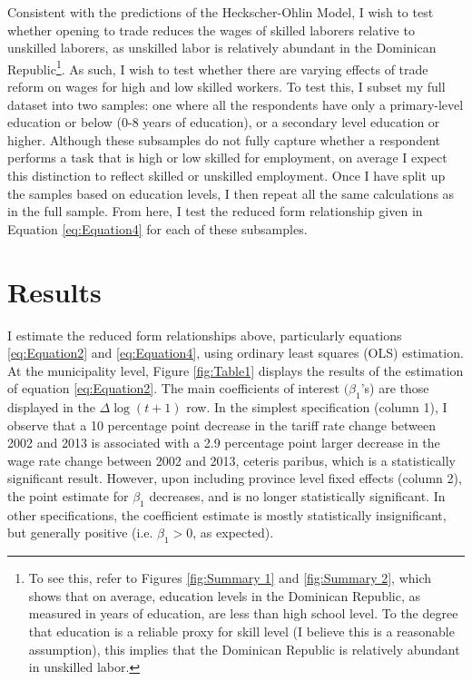 \documentclass[12pt]{article}
\begin{document}
Consistent with the predictions of the Heckscher-Ohlin Model, I wish to test whether opening to
trade reduces the wages of skilled laborers relative to unskilled laborers, as unskilled labor
is relatively abundant in the Dominican Republic\footnote{To see this, refer to Figures \ref{fig:Summary 1}
and \ref{fig:Summary 2}, which shows that on average, education levels in the Dominican Republic,
as measured in years of education, are less than high school level. To the degree that education
is a reliable proxy for skill level (I believe this is a reasonable assumption), this implies that 
the Dominican Republic is relatively abundant in unskilled labor.}. 
As such, I wish to test whether there are varying effects of trade reform on wages for high and 
low skilled workers. To test this, I subset my full dataset into two samples: one where all
the respondents have only a primary-level education or below (0-8 years of education), or
a secondary level education or higher. Although these subsamples do not fully capture whether a respondent
performs a task that is high or low skilled for employment, on average I expect this distinction to
reflect skilled or unskilled employment. Once I have split up the samples based on education levels,
I then repeat all the same calculations as in the full sample. From here, I test the reduced form 
relationship given in Equation \ref{eq:Equation4} for each of these subsamples. 

\vspace{-10pt}
\section{Results}
\label{sec:Results}
I estimate the reduced form relationships above, particularly equations \ref{eq:Equation2}
and \ref{eq:Equation4}, using ordinary least squares (OLS) estimation.  At the municipality
level, Figure \ref{fig:Table1} displays the results of the estimation of equation \ref{eq:Equation2}. 
The main coefficients of interest $(\beta_1$'s) are those displayed in the $\Delta\log(t+1)$ row. In the simplest
specification (column 1), I observe that a 10 percentage point decrease in the tariff rate change between
2002 and 2013 is associated with a 2.9 percentage point larger decrease in the wage rate change between 
2002 and 2013, ceteris paribus, which is a statistically significant result. However, upon including 
province level fixed effects (column 2), the point estimate for $\beta_1$ decreases, and is no longer 
statistically significant. In other specifications, the coefficient estimate is mostly statistically 
insignificant, but generally positive (i.e. $\beta_1 > 0$, as expected).
\end{document}
